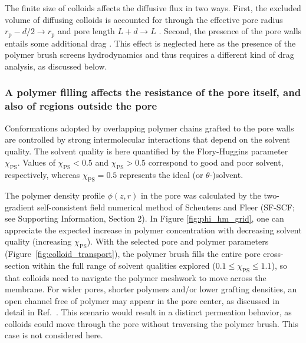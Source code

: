 \documentclass[12pt, a4paper]{article}
\begin{document}
The finite size of colloids affects the diffusive flux in two ways.
First, the excluded volume of diffusing colloids is accounted for through the effective pore radius $r_{\text{p}} - d/2\rightarrow r_{\text{p}} $ and pore length $L + d \rightarrow L$ \cite{Renkin1954, Beck1970, Bungay1973, Anderson1974, Brenner1977}.
Second, the presence of the pore walls entails some additional drag \cite{Ladenburg1907, Faxen1922, Haberman1958}.
This effect is neglected here as the presence of the polymer brush screens hydrodynamics and thus requires a different kind of drag analysis, as discussed below.


\subsubsection{A polymer filling affects the resistance of the pore itself, and also of regions outside the pore}

Conformations adopted by overlapping polymer chains grafted to the pore walls are controlled by strong intermolecular interactions that depend on the solvent quality.
The solvent quality is here quantified by the Flory-Huggins parameter $\chi_{\text{PS}}$.
Values of $\chi_{\text{PS}}<0.5$ and $\chi_{\text{PS}}>0.5$ correspond to good and poor solvent, respectively, whereas $\chi_{\text{PS}}=0.5$ represents the ideal (or $\theta$-)solvent.

The polymer density profile $\phi(z,r)$ in the pore was calculated by the two-gradient self-consistent field numerical method of Scheutens and Fleer (SF-SCF; see Supporting Information, Section 2).
In Figure \ref{fig:phi_hm_grid}, one can appreciate the expected increase in polymer concentration with decreasing solvent quality (increasing $\chi_{\text{PS}}$).
With the selected pore and polymer parameters (Figure~\ref{fig:colloid_transport}), the polymer brush fills the entire pore cross-section within the full range of solvent qualities explored ($0.1\le\chi_{\text{PS}}\le1.1$), so that colloids need to navigate the polymer meshwork to move across the membrane.
For wider pores, shorter polymers and/or lower grafting densities, an open channel free of polymer may appear in the pore center, as discussed in detail in Ref.~\cite{Laktionov2021}.
This scenario would result in a distinct permeation behavior, as colloids could move through the pore without traversing the polymer brush.
This case is not considered here.
\end{document}

